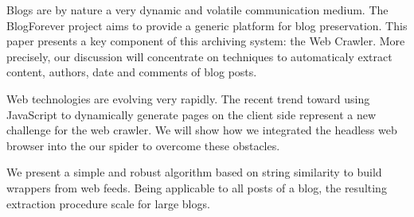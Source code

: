 Blogs are by nature a very dynamic and volatile communication medium. The BlogForever project aims to provide a generic platform for blog preservation. This paper presents a key component of this archiving system: the Web Crawler. More precisely, our discussion will concentrate on techniques to automaticaly extract content, authors, date and comments of blog posts.

Web technologies are evolving very rapidly. The recent trend toward using JavaScript to dynamically generate pages on the client side represent a new challenge for the web crawler. We will show how we integrated the headless web browser into the our spider to overcome these obstacles.

We present a simple and robust algorithm based on string similarity to build wrappers from web feeds. Being applicable to all posts of a blog, the resulting extraction procedure scale for large blogs.
